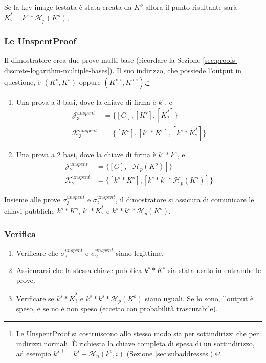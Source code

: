 Se la key image testata è stata creata da $K^o$ allora il punto risultante sarà $\tilde{K}^s_? = k^s*\mathcal{H}_p(K^o)$.

\subsubsection*{Le UnspentProof}

Il dimostratore crea due prove multi-base (ricordare la Sezione \ref{sec:proofs-discrete-logarithm-multiple-bases}). Il suo indirizzo, che possiede l’output in questione, è $(K^v, K^s)$ oppure $(K^{v,i}, K^{s,i})$.\footnote{Le UnspentProof si costruiscono allo stesso modo sia per sottindirizzi che per indirizzi normali. È richiesta la chiave completa di spesa di un sottindirizzo, ad esempio $k^{s,i} = k^s + \mathcal{H}_n(k^v,i)$ (Sezione \ref{sec:subaddresses}).}

\begin{enumerate}
    \item Una prova a 3 basi, dove la chiave di firma è $k^s$, e\vspace{.175cm}
    \begin{align*}
        \mathcal{J}^{unspent}_3 &= \{[G], [K^s], [\tilde{K}^s_?]\}\\
        \mathcal{K}^{unspent}_3 &= \{[K^s], [k^s*K^s], [k^s*\tilde{K}^s_?]\}
    \end{align*}
    \item Una prova a 2 basi, dove la chiave di firma è $k^s*k^s$, e\vspace{.175cm}
    \begin{align*}
        \mathcal{J}^{unspent}_2 &= \{[G], [\mathcal{H}_p(K^o)]\}\\
        \mathcal{K}^{unspent}_2 &= \{[k^s*K^s], [k^s*k^s*\mathcal{H}_p(K^o)]\}
    \end{align*}
\end{enumerate}

Insieme alle prove $\sigma^{unspent}_3$ e $\sigma^{unspent}_2$, il dimostratore si assicura di comunicare le chiavi pubbliche $k^s*K^s$, $k^s*\tilde{K}^s_?$ e $k^s*k^s*\mathcal{H}_p(K^o)$.

\subsubsection*{Verifica}

\begin{enumerate}
    \item Verificare che $\sigma^{unspent}_3$ e $\sigma^{unspent}_2$ siano legittime.
    \item Assicurarsi che la stessa chiave pubblica $k^s*K^s$ sia stata usata in entrambe le prove.
    \item Verificare se $k^s*\tilde{K}^s_?$ e $k^s*k^s*\mathcal{H}_p(K^o)$ siano uguali. Se lo sono, l'output è speso, e se no è non speso (eccetto con probabilità trascurabile).
\end{enumerate}{}


